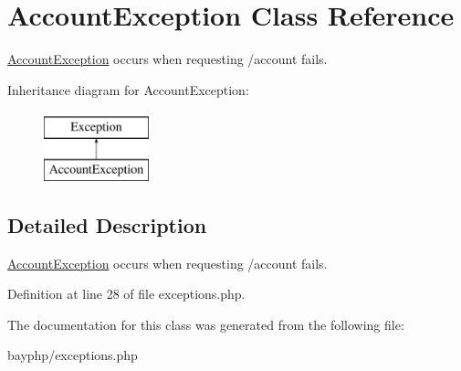 \hypertarget{classAccountException}{
\section{AccountException Class Reference}
\label{classAccountException}
}


\hyperlink{classAccountException}{AccountException} occurs when requesting /account fails.  


Inheritance diagram for AccountException:\begin{figure}[H]
\begin{center}
\leavevmode
\includegraphics[height=2.000000cm]{classAccountException}
\end{center}
\end{figure}


\subsection{Detailed Description}
\hyperlink{classAccountException}{AccountException} occurs when requesting /account fails. 

Definition at line 28 of file exceptions.php.



The documentation for this class was generated from the following file:\begin{DoxyCompactItemize}
\item 
bayphp/exceptions.php\end{DoxyCompactItemize}
